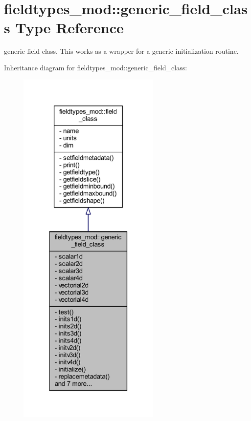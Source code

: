 \hypertarget{structfieldtypes__mod_1_1generic__field__class}{}\section{fieldtypes\+\_\+mod\+:\+:generic\+\_\+field\+\_\+class Type Reference}
\label{structfieldtypes__mod_1_1generic__field__class}


generic field class. This works as a wrapper for a generic initialization routine.  




Inheritance diagram for fieldtypes\+\_\+mod\+:\+:generic\+\_\+field\+\_\+class\+:\nopagebreak
\begin{figure}[H]
\begin{center}
\leavevmode
\includegraphics[width=199pt]{structfieldtypes__mod_1_1generic__field__class__inherit__graph}
\end{center}
\end{figure}


